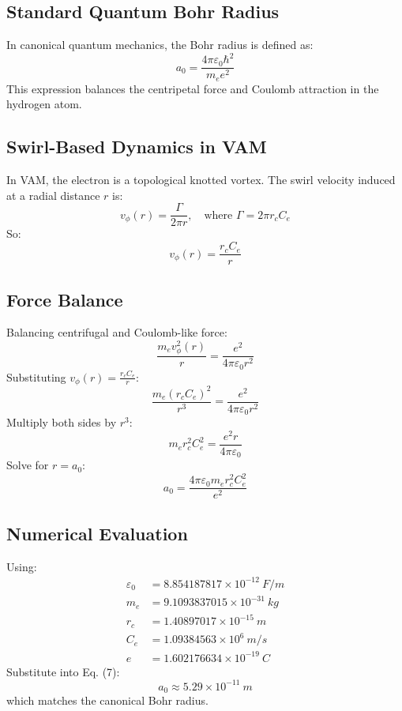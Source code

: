 \subsection*{Standard Quantum Bohr Radius}
In canonical quantum mechanics, the Bohr radius is defined as:
\begin{equation}
    a_0 = \frac{4\pi \varepsilon_0 \hbar^2}{m_e e^2}
\end{equation}
This expression balances the centripetal force and Coulomb attraction in the hydrogen atom.

\subsection*{Swirl-Based Dynamics in VAM}
In VAM, the electron is a topological knotted vortex. The swirl velocity induced at a radial distance \( r \) is:
\begin{equation}
    v_\phi(r) = \frac{\Gamma}{2\pi r}, \quad \text{where } \Gamma = 2\pi r_c C_e
\end{equation}
So:
\begin{equation}
    v_\phi(r) = \frac{r_c C_e}{r}
\end{equation}

\subsection*{Force Balance}
Balancing centrifugal and Coulomb-like force:
\begin{equation}
    \frac{m_e v_\phi^2(r)}{r} = \frac{e^2}{4\pi \varepsilon_0 r^2}
\end{equation}
Substituting \( v_\phi(r) = \frac{r_c C_e}{r} \):
\begin{equation}
    \frac{m_e (r_c C_e)^2}{r^3} = \frac{e^2}{4\pi \varepsilon_0 r^2}
\end{equation}
Multiply both sides by \( r^3 \):
\begin{equation}
    m_e r_c^2 C_e^2 = \frac{e^2 r}{4\pi \varepsilon_0}
\end{equation}
Solve for \( r = a_0 \):
\begin{equation}
    \boxed{a_0 = \frac{4\pi \varepsilon_0 m_e r_c^2 C_e^2}{e^2}}
\end{equation}

\subsection*{Numerical Evaluation}
Using:
\begin{align*}
    \varepsilon_0 &= 8.854187817 \times 10^{-12}~\si{F/m} \\
    m_e &= 9.1093837015 \times 10^{-31}~\si{kg} \\
    r_c &= 1.40897017 \times 10^{-15}~\si{m} \\
    C_e &= 1.09384563 \times 10^6~\si{m/s} \\
    e &= 1.602176634 \times 10^{-19}~\si{C}
\end{align*}
Substitute into Eq. (7):
\begin{equation}
    a_0 \approx 5.29 \times 10^{-11}~\si{m}
\end{equation}
\noindent
which matches the canonical Bohr radius.

